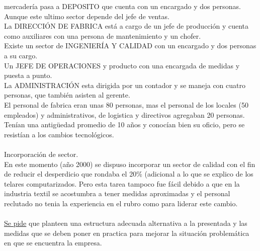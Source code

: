 \documentclass[a4paper,10pt,titlepage]{article}
\begin{document}
mercadería pasa a DEPOSITO que cuenta con un encargado y dos personas.
Aunque este ultimo sector depende del jefe de ventas.\\
La DIRECCIÓN DE FABRICA está a cargo de un jefe de producción y cuenta
como auxiliares con una persona de mantenimiento y un chofer.\\
Existe un sector de INGENIERÍA Y CALIDAD con un encargado y dos personas a
su cargo.\\
Un JEFE DE OPERACIONES y producto con una encargada de medidas y puesta
a punto.\\
La ADMINISTRACIÓN esta dirigida por un contador y se maneja con cuatro
personas, que también asisten al gerente.\\
El personal de fabrica eran unas 80 personas, mas el personal de los locales (50
empleados) y administrativos, de logistica y directivos agregaban 20 personas.
Tenían una antigüedad promedio de 10 años y conocían bien su oficio, pero se
resistían a los cambios tecnológicos.\\ \\
Incorporación de sector.\\
En este momento (año 2000) se dispuso incorporar un sector de calidad con el fin
de reducir el desperdicio que rondaba el 20\% (adicional a lo que se explico de los
telares computarizados. Pero esta tarea tampoco fue fácil debido a que en la
industria textil se acostumbra a tener medidas aproximadas y el personal reclutado
no tenia la experiencia en el rubro como para liderar este cambio.\\ \\
\underline{Se pide} que planteen una estructura adecuada alternativa a la presentada y las
medidas que se deben poner en practica para mejorar la situación problemática en
que se encuentra la empresa.\\
\end{document}
